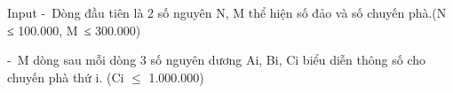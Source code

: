 Input
- Dòng đầu tiên là 2 số nguyên N, M thể hiện số đảo và số chuyến phà.(N ≤ 100.000, M ≤ 300.000)  

   - M dòng sau mỗi dòng 3 số nguyên dương Ai, Bi, Ci biểu diễn thông số cho chuyến phà thứ i. (Ci  $\le$  1.000.000)